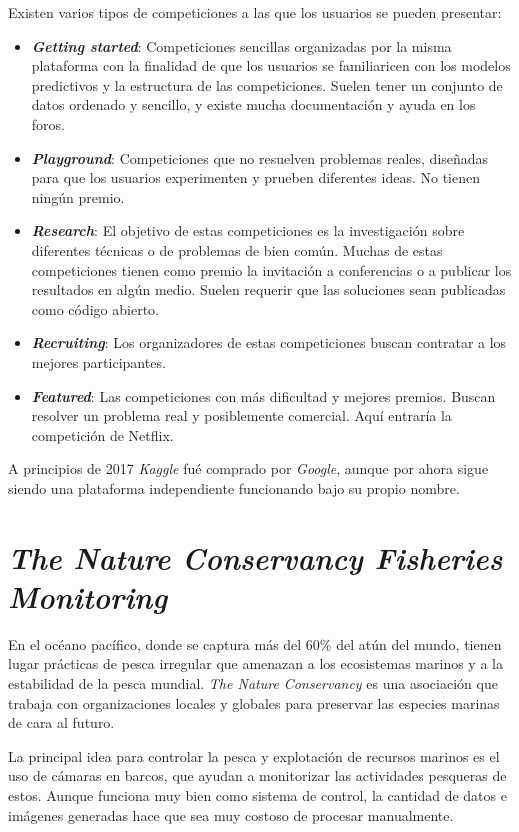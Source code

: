 Existen varios tipos de competiciones a las que los usuarios se pueden
presentar:

\begin{itemize}
  \item \textit{\textbf{Getting started}}: Competiciones sencillas organizadas por la
      misma plataforma con la finalidad de que los usuarios se familiaricen con
      los modelos predictivos y la estructura de las competiciones. Suelen tener
      un conjunto de datos ordenado y sencillo, y existe mucha documentación y
      ayuda en los foros.
  \item \textit{\textbf{Playground}}: Competiciones que no resuelven problemas
      reales, diseñadas para que los usuarios experimenten y prueben diferentes
      ideas. No tienen ningún premio.
  \item \textit{\textbf{Research}}: El objetivo de estas competiciones es la
      investigación sobre diferentes técnicas o de problemas de bien común.
      Muchas de estas competiciones tienen como premio la invitación a
      conferencias o a publicar los resultados en algún medio. Suelen requerir
      que las soluciones sean publicadas como código abierto.
  \item \textit{\textbf{Recruiting}}: Los organizadores de estas competiciones
      buscan contratar a los mejores participantes.
  \item \textit{\textbf{Featured}}: Las competiciones con más dificultad y
      mejores premios. Buscan resolver un problema real y posiblemente
      comercial. Aquí entraría la competición de Netflix.
\end{itemize}

A principios de 2017 \textit{Kaggle} fué comprado por \textit{Google}, aunque por ahora sigue siendo una
plataforma independiente funcionando bajo su propio nombre.

\section{\textit{ The Nature Conservancy Fisheries Monitoring }}

En el océano pacífico, donde se captura más del 60\% del atún del mundo, tienen lugar prácticas de pesca irregular que amenazan a los ecosistemas marinos y a la estabilidad de la pesca mundial. \textit{The Nature Conservancy} es una asociación que trabaja con organizaciones locales y globales para preservar las especies marinas de cara al futuro.

La principal idea para controlar la pesca y explotación de recursos marinos es el uso de cámaras en barcos, que ayudan a monitorizar las actividades pesqueras de estos. Aunque funciona muy bien como sistema de control, la cantidad de datos e imágenes generadas hace que sea muy costoso de procesar manualmente.

